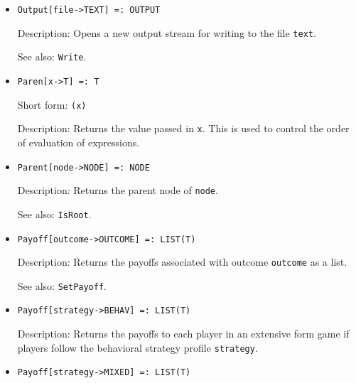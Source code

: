 \begin{itemize}
\item
\protect \large \begin{verbatim}
Output[file->TEXT] =: OUTPUT
\end{verbatim}\normalsize

\bd
\item
[Description:] Opens a new output stream for writing to the file \verb+text+.
\item
[See also:] {\tt Write}.
\ed


\item
\protect \large \begin{verbatim}
Paren[x->T] =: T
\end{verbatim}\normalsize

\bd
\item
[Short form:] \verb+(x)+
\item
[Description:] Returns the value passed in \verb+x+.  This is used to control
the order of evaluation of expressions.
\ed

\item
\protect \large \begin{verbatim}
Parent[node->NODE] =: NODE
\end{verbatim}\normalsize

\bd
\item
[Description:] Returns the parent node of \verb+node+.
\item
[See also:] {\tt IsRoot}.
\ed

\item
\protect \large \begin{verbatim}
Payoff[outcome->OUTCOME] =: LIST(T)
\end{verbatim}\normalsize

\bd
\item
[Description:] Returns the payoffs associated with outcome \verb+outcome+
as a list.
\item
[See also:] {\tt SetPayoff}.
\ed

\item
\protect \large \begin{verbatim}
Payoff[strategy->BEHAV] =: LIST(T)
\end{verbatim}\normalsize

\bd
\item
[Description:] Returns the payoffs to each player in an extensive form game
if players follow the behavioral strategy profile \verb+strategy+.
\ed

\item
\protect \large \begin{verbatim}
Payoff[strategy->MIXED] =: LIST(T)
\end{verbatim}\normalsize


\end{itemize}
